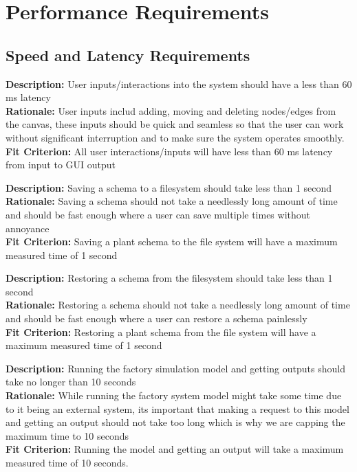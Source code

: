 \documentclass[12pt]{article}
\begin{document}
\section{Performance Requirements}
\subsection{Speed and Latency Requirements}
\begin{tcolorbox}[title=PS1]
  \textbf{Description:} User inputs/interactions into the system should have a less than 60 ms latency \\
  \textbf{Rationale:} User inputs includ adding, moving and deleting nodes/edges from the canvas, these inputs should be quick and seamless so that the user can work without significant interruption and to make sure the system operates smoothly. \\
  \textbf{Fit Criterion:} All user interactions/inputs will have less than 60 ms latency from input to GUI output
\end{tcolorbox}
\begin{tcolorbox}[title=PS2]
  \textbf{Description:} Saving a schema to a filesystem should take less than 1 second \\
  \textbf{Rationale:} Saving a schema should not take a needlessly long amount of time and should be fast enough where a user can save multiple times without annoyance \\
  \textbf{Fit Criterion:} Saving a plant schema to the file system will have a maximum measured time of 1 second
\end{tcolorbox}
\begin{tcolorbox}[title=PS3]
  \textbf{Description:} Restoring a schema from the filesystem should take less than 1 second \\
  \textbf{Rationale:} Restoring a schema should not take a needlessly long amount of time and should be fast enough where a user can restore a schema painlessly \\
  \textbf{Fit Criterion:} Restoring a plant schema from the file system will have a maximum measured time of 1 second
\end{tcolorbox}
\begin{tcolorbox}[title=PS4]
  \textbf{Description:} Running the factory simulation model and getting outputs should take no longer than 10 seconds \\
  \textbf{Rationale:} While running the factory system model might take some time due to it being an external system, its important that making a request to this model and getting an output should not take too long which is why we are capping the maximum time to 10 seconds \\
  \textbf{Fit Criterion:} Running the model and getting an output will take a maximum measured time of 10 seconds. 
\end{tcolorbox}
\end{document}
